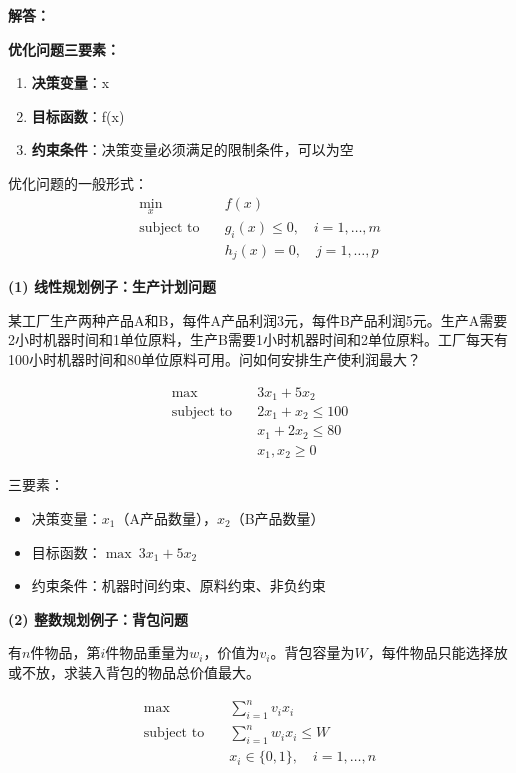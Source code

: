 \documentclass[12pt,a4paper]{article}
\begin{document}
	\textbf{解答：}
	
	\textbf{优化问题三要素：}
	\begin{enumerate}
		\item \textbf{决策变量}：x
		\item \textbf{目标函数}：f(x)
		\item \textbf{约束条件}：决策变量必须满足的限制条件，可以为空
	\end{enumerate}
	
	优化问题的一般形式：
	$$\begin{aligned}
	\min_{x} \quad & f(x) \\
	\text{subject to} \quad & g_i(x) \leq 0, \quad i=1,\ldots,m \\
	& h_j(x) = 0, \quad j=1,\ldots,p
	\end{aligned}$$
	
	\textbf{(1) 线性规划例子：生产计划问题}
	
	某工厂生产两种产品A和B，每件A产品利润3元，每件B产品利润5元。生产A需要2小时机器时间和1单位原料，生产B需要1小时机器时间和2单位原料。工厂每天有100小时机器时间和80单位原料可用。问如何安排生产使利润最大？
	
	$$\begin{aligned}
	\max \quad & 3x_1 + 5x_2 \\
	\text{subject to} \quad & 2x_1 + x_2 \leq 100 \\
	& x_1 + 2x_2 \leq 80 \\
	& x_1, x_2 \geq 0
	\end{aligned}$$
	
	三要素：
	\begin{itemize}
		\item 决策变量：$x_1$（A产品数量），$x_2$（B产品数量）
		\item 目标函数：$\max\ 3x_1 + 5x_2$
		\item 约束条件：机器时间约束、原料约束、非负约束
	\end{itemize}
	
	\textbf{(2) 整数规划例子：背包问题}
	
	有$n$件物品，第$i$件物品重量为$w_i$，价值为$v_i$。背包容量为$W$，每件物品只能选择放或不放，求装入背包的物品总价值最大。
	
	$$\begin{aligned}
	\max \quad & \sum_{i=1}^{n} v_i x_i \\
	\text{subject to} \quad & \sum_{i=1}^{n} w_i x_i \leq W \\
	& x_i \in \{0, 1\}, \quad i=1,\ldots,n
	\end{aligned}$$
	
\end{document}
